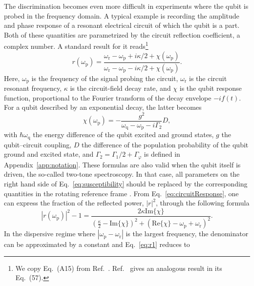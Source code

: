 \documentclass[aps, prx, showpacs, twocolumn, superscriptaddress, notitlepage, longbibliography, floatfix, nofootinbib]{revtex4-2}
\begin{document}
The discrimination becomes even more difficult in experiments where the qubit is probed in the frequency domain. A typical example is recording the amplitude and phase response of a resonant electrical circuit of which the qubit is a part. Both of these quantities are parametrized by the circuit reflection coefficient, a complex number. A standard result for it reads\footnote{
We copy Eq.~(A15) from Ref.~\cite{ezzouch_dispersively_2021}. Ref.~\cite{cottet_cavity_2017} gives an analogous result in its Eq.~(57).
}
\begin{equation}
r(\omega_\mathrm{p})=\frac{\omega_\mathrm{r}-\omega_\mathrm{p}+i\kappa/2+\chi(\omega_\mathrm{p})}{\omega_\mathrm{r}-\omega_\mathrm{p}-i\kappa/2+\chi(\omega_\mathrm{p})}.
\label{eq:circuitResponse}
\end{equation}
Here, $\omega_\mathrm{p}$ is the frequency of the signal probing the circuit, $\omega_\mathrm{r}$ is the circuit resonant frequency, 
$\kappa$ is the circuit-field decay rate, 
and $\chi$ is the qubit response function, proportional to the Fourier transform of the decay envelope $-i f(t)$. For a qubit described by an exponential decay, the latter becomes\cite{cottet_cavity_2017,ezzouch_dispersively_2021}
\begin{equation}
\chi(\omega_\mathrm{p}) = -\frac{g^2}{\omega_\mathrm{q}-\omega_\mathrm{p}-i\Gamma_2}D,
\label{eq:susceptibility}
\end{equation}
with $\hbar \omega_\mathrm{q}$ the energy difference of the qubit excited and ground states, $g$ the qubit--circuit coupling, $D$ the difference of the population probability of the qubit ground and excited state, and $\Gamma_2 = \Gamma_1/2 +\Gamma_\varphi$ is defined in Appendix~\ref{app:notation}. These formulas are also valid when the qubit itself is driven, the so-called two-tone spectroscopy\cite{scarlino_all-microwave_2019}. In that case, all parameters on the right hand side of Eq.~\eqref{eq:susceptibility} should be replaced by the corresponding quantities in the rotating reference frame \cite{ithier_decoherence_2005}.
From Eq.~\eqref{eq:circuitResponse}, one can express the fraction of the reflected power, $|r|^2$, through the following formula
\begin{equation}
\label{eq:r1}
|r(\omega_\mathrm{p})|^2 -1 = \frac{2\kappa\mathrm{Im}\{\chi\}}{\left(\frac{\kappa}{2} -\mathrm{Im}\{\chi\}\right)^2 + \left(\mathrm{Re}\{\chi \} -\omega_\mathrm{p} + \omega_\mathrm{r}\right)^2}.
\end{equation}
In the dispersive regime where $|\omega_\mathrm{p}-\omega_\mathrm{r}|$ is the largest frequency, the denominator can be approximated by a constant and Eq.~\eqref{eq:r1} reduces to 
\end{document}

